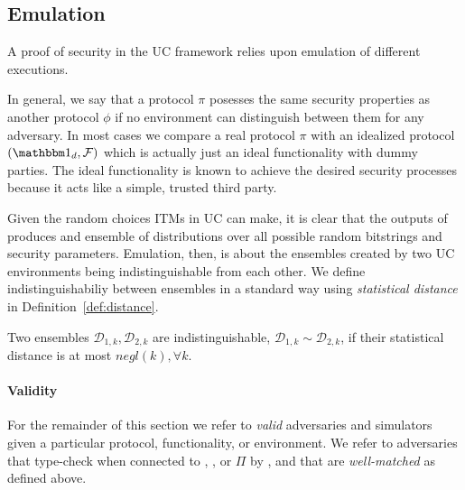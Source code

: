 \subsection{Emulation}
A proof of security in the UC framework relies upon emulation of different executions.

In general, we say that a protocol $\pi$ posesses the same security properties as another protocol $\phi$ if no environment can distinguish between them for any adversary.
In most cases we compare a real protocol $\pi$ with an idealized protocol $(\idealP, \F)$ which is actually just an ideal functionality with dummy parties.
The ideal functionality is known to achieve the desired security processes because it acts like a simple, trusted third party.

Given the random choices ITMs in UC can make, it is clear that the outputs of  produces and ensemble of distributions over all possible random bitstrings and security parameters.
Emulation, then, is about the ensembles created by two UC environments being indistinguishable from each other.
We define indistinguishabiliy between ensembles in a standard way using \textit{statistical distance} in Definition~\ref{def:distance}.

\begin{definition}[Indisinguishability]\label{def:distance}
Two ensembles $\mathcal{D}_{1,k}, \mathcal{D}_{2,k}$ are indistinguishable, $\mathcal{D}_{1,k} \sim \mathcal{D}_{2,k}$, if their statistical distance is at most $negl(k), \forall k$.
\end{definition}

\paragraph{Validity}
For the remainder of this section we refer to \emph{valid} adversaries and simulators given a particular protocol, functionality, or environment.
We refer to adversaries that type-check when connected to \Z, \F, or $\Pi$ by , and that are \emph{well-matched} as defined above. 


